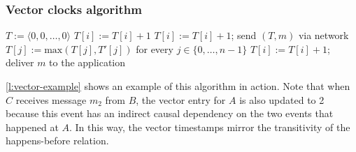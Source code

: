 \begin{frame}
    \label{s:vector-definition}
    \frametitle{Vector clocks algorithm}
    \begin{algorithmic}
            \State $T := \langle 0, 0, \dots, 0 \rangle$ 
        \EndOn
        \State
            \State $T[i] := T[i] + 1$
        \EndOn
        \State
            \State $T[i] := T[i] + 1$; send $(T, m)$ via network
        \EndOn
        \State
            \State $T[j] := \mathrm{max}(T[j], T'[j])$ for every $j \in \{0, \dots, n-1\}$
            \State $T[i] := T[i] + 1$; deliver $m$ to the application
        \EndOn
    \end{algorithmic}
\end{frame}
\label{l:vector-definition}

\autoref{l:vector-example} shows an example of this algorithm in action.
Note that when $C$ receives message $m_2$ from $B$, the vector entry for $A$ is also updated to 2 because this event has an indirect causal dependency on the two events that happened at $A$.
In this way, the vector timestamps mirror the transitivity of the happens-before relation.

